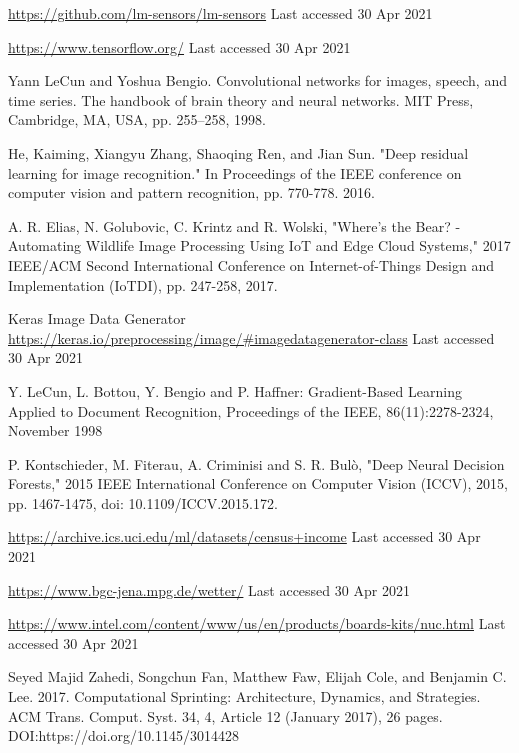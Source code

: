 \documentclass[runningheads]{llncs}
\begin{document}
\begin{thebibliography}{8}
\url{https://github.com/lm-sensors/lm-sensors} Last accessed 30 Apr 2021 

\url{https://www.tensorflow.org/} Last accessed 30 Apr 2021 


Yann LeCun and Yoshua Bengio. Convolutional networks for images, speech, and time series. The handbook of brain theory and neural networks. MIT Press, Cambridge, MA, USA, pp. 255–258, 1998.

He, Kaiming, Xiangyu Zhang, Shaoqing Ren, and Jian Sun. "Deep residual learning for image recognition." In Proceedings of the IEEE conference on computer vision and pattern recognition, pp. 770-778. 2016.

A. R. Elias, N. Golubovic, C. Krintz and R. Wolski, "Where's the Bear? - Automating Wildlife Image Processing Using IoT and Edge Cloud Systems," 2017 IEEE/ACM Second International Conference on Internet-of-Things Design and Implementation (IoTDI), pp. 247-258, 2017.

Keras Image Data Generator \url{https://keras.io/preprocessing/image/\#imagedatagenerator-class} Last accessed 30 Apr 2021



Y. LeCun, L. Bottou, Y. Bengio and P. Haffner: Gradient-Based Learning Applied to Document Recognition, Proceedings of the IEEE, 86(11):2278-2324, November 1998

P. Kontschieder, M. Fiterau, A. Criminisi and S. R. Bulò, "Deep Neural Decision Forests," 2015 IEEE International Conference on Computer Vision (ICCV), 2015, pp. 1467-1475, doi: 10.1109/ICCV.2015.172.

\url{https://archive.ics.uci.edu/ml/datasets/census+income} Last accessed 30 Apr 2021

\url{https://www.bgc-jena.mpg.de/wetter/} Last accessed 30 Apr 2021 

\url{https://www.intel.com/content/www/us/en/products/boards-kits/nuc.html} Last accessed 30 Apr 2021 









Seyed Majid Zahedi, Songchun Fan, Matthew Faw, Elijah Cole, and Benjamin C. Lee. 2017. Computational Sprinting: Architecture, Dynamics, and Strategies. ACM Trans. Comput. Syst. 34, 4, Article 12 (January 2017), 26 pages. DOI:https://doi.org/10.1145/3014428



\end{thebibliography}
\end{document}
